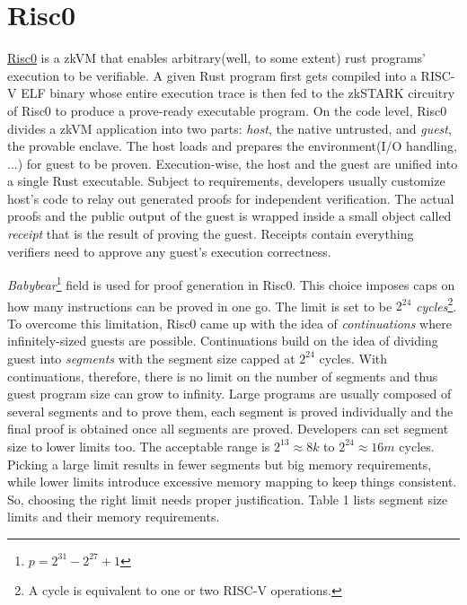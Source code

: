 \documentclass[a4paper, 10pt]{article}
\begin{document}
\section{Risc0}
\href{https://www.risczero.com}{Risc0} is a zkVM that enables arbitrary(well, to some extent) rust programs' execution to be verifiable. A given Rust program first gets compiled into a RISC-V ELF binary whose entire execution trace is then fed to the zkSTARK circuitry of Risc0 to produce a prove-ready executable program. On the code level, Risc0 divides a zkVM application into two parts: \textit{host}, the native untrusted, and \textit{guest}, the provable enclave. The host loads and prepares the environment(I/O handling, ...) for guest to be proven. Execution-wise, the host and the guest are unified into a single Rust executable. Subject to requirements, developers usually customize host's code to relay out generated proofs for independent verification. The actual proofs and the public output of the guest is wrapped inside a small object called \textit{receipt} that is the result of proving the guest. Receipts contain everything verifiers need to approve any guest's execution correctness. 
\par
\textit{Babybear}\footnote{$p=2^{31}-2^{27}+1$} field is used for proof generation in Risc0. This choice imposes caps on how many instructions can be proved in one go. The limit is set to be $2^{24}$ \textit{cycles}\footnote{A cycle is equivalent to one or two RISC-V operations.}. To overcome this limitation, Risc0 came up with the idea of \textit{continuations} where infinitely-sized guests are possible. Continuations build on the idea of dividing guest into \textit{segments} with the segment size capped at $2^{24}$ cycles. With continuations, therefore, there is no limit on the number of segments and thus guest program size can grow to infinity. Large programs are usually composed of several segments and to prove them, each segment is proved individually and the final proof is obtained once all segments are proved. Developers can set segment size to lower limits too. The acceptable range is $2^{13}\approx 8k$ to $2^{24}\approx 16m$ cycles. Picking a large limit results in fewer segments but big memory requirements, while lower limits introduce excessive memory mapping to keep things consistent. So, choosing the right limit needs proper justification. Table 1 lists segment size limits and their memory requirements.
\end{document}
